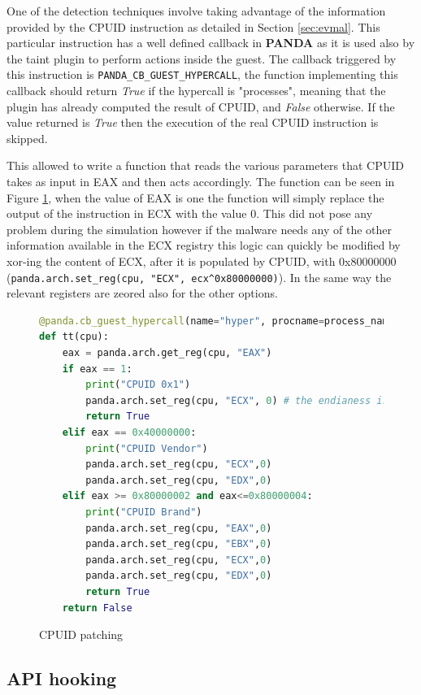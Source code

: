 One of the detection techniques involve taking advantage of the information provided by the CPUID instruction as detailed in Section \ref{sec:evmal}. This particular instruction has a well defined callback in \textbf{PANDA} as it is used also by the taint plugin to perform actions inside the guest. The callback triggered by this instruction is \lstinline{PANDA_CB_GUEST_HYPERCALL}, the function implementing this callback should return \textit{True} if the hypercall is "processes", meaning that the plugin has already computed the result of CPUID, and \textit{False} otherwise. If the value returned is \textit{True} then the execution of the real CPUID instruction is skipped.

This allowed to write a function that reads the various parameters that CPUID takes as input in EAX and then acts accordingly. The function can be seen in Figure \ref{fig:cpuidpat}, when the value of EAX is one the function will simply replace the output of the instruction in ECX with the value 0. This did not pose any problem during the simulation however if the malware needs any of the other information available in the ECX registry this logic can quickly be modified by xor-ing the content of ECX, after it is populated by CPUID, with 0x80000000 (\lstinline{panda.arch.set_reg(cpu, "ECX", ecx^0x80000000)}). In the same way the relevant registers are zeored also for the other options.

\begin{figure}[htp]
\centering
\begin{lstlisting}[language=Python] 
@panda.cb_guest_hypercall(name="hyper", procname=process_name)
def tt(cpu):
    eax = panda.arch.get_reg(cpu, "EAX")
    if eax == 1:
        print("CPUID 0x1")
        panda.arch.set_reg(cpu, "ECX", 0) # the endianess is swapped (?)
        return True
    elif eax == 0x40000000:
        print("CPUID Vendor")
        panda.arch.set_reg(cpu, "ECX",0)
        panda.arch.set_reg(cpu, "EDX",0)
    elif eax >= 0x80000002 and eax<=0x80000004:
        print("CPUID Brand")
        panda.arch.set_reg(cpu, "EAX",0)
        panda.arch.set_reg(cpu, "EBX",0)
        panda.arch.set_reg(cpu, "ECX",0)
        panda.arch.set_reg(cpu, "EDX",0)
        return True
    return False
\end{lstlisting}
\caption{CPUID patching}
\label{fig:cpuidpat}
\end{figure}


\subsection{API hooking}

